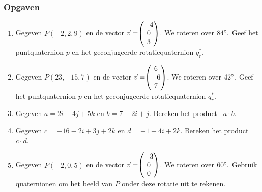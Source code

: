 
\newpage
\subsubsection{Opgaven}
\begin{enumerate}
	\item Gegeven $ P (-2, 2, 9) $ en de vector $\vec{v} = \vecdrie{-4}{0}{3} $. 
	We roteren over $ 84\degree. $ Geef het puntquaternion $p$ en het geconjugeerde rotatiequaternion  $  q_r^* $. \\
	\item Gegeven $ P (23, -15, 7) $ en de vector $\vec{v} = \vecdrie{6}{-6}{7} $. 
	We roteren over $ 42\degree. $ Geef het puntquaternion $p$ en het geconjugeerde rotatiequaternion  $  q_r^* $.\\
	
	\item Gegeven $ a = 2i-4j+5k$ en   $ b = 7+2i+j $. 
	Bereken het product \ $  a\cdot b $.\\
	\item Gegeven $ c = -16 -2i+3j+2k $ en   $ d = -1+4i+2k $. 
	Bereken het product \ $  c\cdot d $.\\
	
	\item Gegeven $ P (-2, 0, 5) $ en de vector $\vec{v} = \vecdrie{-3}{0}{0} $. 
	We roteren over $ 60\degree. $ Gebruik quaternionen om het beeld van $P$ onder deze rotatie uit te rekenen.\\
\end{enumerate}

